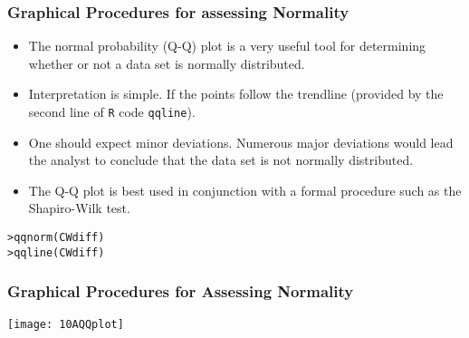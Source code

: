 

\begin{frame}[fragile]
\frametitle{Graphical Procedures for assessing Normality}

\begin{itemize}
\item The normal probability (Q-Q) plot is a very useful tool for determining whether or not a data set is normally distributed.
\item Interpretation is simple. If the points follow the trendline (provided by the second line of \texttt{R} code \texttt{qqline}).
\item One should expect minor deviations. Numerous major deviations would lead the analyst to conclude that the data set is not normally distributed.
\item The Q-Q plot is best used in conjunction with a formal procedure such as the Shapiro-Wilk test.
\end{itemize}

\begin{verbatim}
>qqnorm(CWdiff)
>qqline(CWdiff)
\end{verbatim}

\end{frame}


\begin{frame}
\frametitle{Graphical Procedures for Assessing Normality}

\begin{center}
\texttt{[image: 10AQQplot]}
\end{center}
\end{frame}
